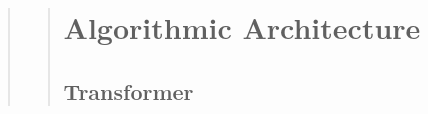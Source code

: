 \begin{quote}
\begin{quote}

%
%
%
%
%
%

\section{Algorithmic Architecture}

\subsection{Transformer}


\end{quote}
\end{quote}
